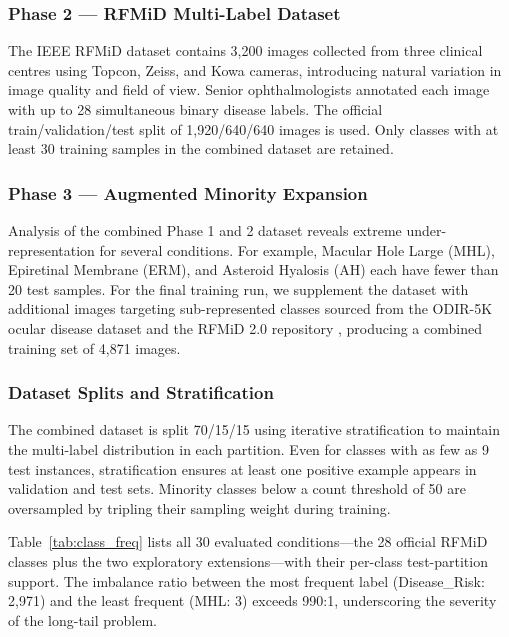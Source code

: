 \documentclass[conference]{IEEEtran}
\begin{document}
\subsubsection{Phase 2 — RFMiD Multi-Label Dataset}
The IEEE RFMiD dataset \cite{pachade2021retinal} contains 3,200 images collected from three clinical centres using Topcon, Zeiss, and Kowa cameras, introducing natural variation in image quality and field of view. Senior ophthalmologists annotated each image with up to 28 simultaneous binary disease labels. The official train/validation/test split of 1,920/640/640 images is used. Only classes with at least 30 training samples in the combined dataset are retained.

\subsubsection{Phase 3 — Augmented Minority Expansion}
Analysis of the combined Phase 1 and 2 dataset reveals extreme under-representation for several conditions. For example, Macular Hole Large (MHL), Epiretinal Membrane (ERM), and Asteroid Hyalosis (AH) each have fewer than 20 test samples. For the final training run, we supplement the dataset with additional images targeting sub-represented classes sourced from the ODIR-5K ocular disease dataset \cite{kaggle_odir5k} and the RFMiD 2.0 repository \cite{pachade2023rfmid2}, producing a combined training set of 4,871 images.

\subsubsection{Dataset Splits and Stratification}
The combined dataset is split 70/15/15 using iterative stratification to maintain the multi-label distribution in each partition. Even for classes with as few as 9 test instances, stratification ensures at least one positive example appears in validation and test sets. Minority classes below a count threshold of 50 are oversampled by tripling their sampling weight during training.

Table~\ref{tab:class_freq} lists all 30 evaluated conditions—the 28 official RFMiD classes plus the two exploratory extensions—with their per-class test-partition support. The imbalance ratio between the most frequent label (Disease\_Risk: 2,971) and the least frequent (MHL: 3) exceeds 990:1, underscoring the severity of the long-tail problem.
\end{document}
